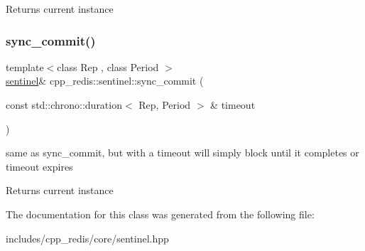 \begin{DoxyReturn}{Returns}
current instance 
\end{DoxyReturn}
\mbox{\label{classcpp__redis_1_1sentinel_afbaa0b80266f70ad98c0bf8f28c533ab}} 
\subsubsection{\texorpdfstring{sync\+\_\+commit()}{sync\_commit()}\hspace{0.1cm}{\footnotesize\ttfamily [2/2]}}
{\footnotesize\ttfamily template$<$class Rep , class Period $>$ \\
\hyperlink{classcpp__redis_1_1sentinel}{sentinel}\& cpp\+\_\+redis\+::sentinel\+::sync\+\_\+commit (\begin{DoxyParamCaption}\item[{const std\+::chrono\+::duration$<$ Rep, Period $>$ \&}]{timeout }\end{DoxyParamCaption})\hspace{0.3cm}{\ttfamily [inline]}}

same as sync\+\_\+commit, but with a timeout will simply block until it completes or timeout expires

\begin{DoxyReturn}{Returns}
current instance 
\end{DoxyReturn}


The documentation for this class was generated from the following file\+:\begin{DoxyCompactItemize}
\item 
includes/cpp\+\_\+redis/core/sentinel.\+hpp\end{DoxyCompactItemize}
